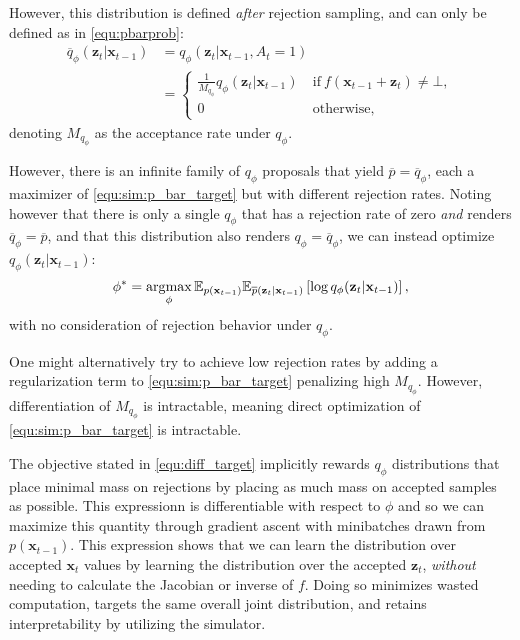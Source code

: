 However, this distribution is defined \emph{after} rejection sampling, and can only be defined as in \eqref{equ:pbarprob}:
\begin{align}
    \overline{q}_{\phi}(\mathbf{z}_t | \mathbf{x}_{t-1}) &= q_{\phi}(\mathbf{z}_t | \mathbf{x}_{t-1}, A_t = 1) \\%
    &=  \begin{cases}
    \frac{1}{M_{q_{\phi}}} q_{\phi}(\mathbf{z}_t | \mathbf{x}_{t-1})\ &\text{if}\ f(\mathbf{x}_{t-1} + \mathbf{z}_t) \neq \bot,\\
    0 & \text{otherwise},
    \end{cases}\nonumber
\end{align}
denoting $M_{q_{\phi}}$ as the acceptance rate under $q_{\phi}$.

However, there is an infinite family of $q_{\phi}$ proposals that yield $\overline{p} = \overline{q}_{\phi}$, each a maximizer of \eqref{equ:sim:p_bar_target} but with different rejection rates.
Noting however that there is only a single $q_{\phi}$ that has a rejection rate of zero \emph{and} renders $\overline{q}_{\phi} = \overline{p}$, and that this distribution also renders $q_{\phi} = \overline{q}_{\phi}$, we can instead optimize $q_{\phi}(\mathbf{z}_t | \mathbf{x}_{t-1})$:
\begin{equation}
\phi^* = \operatorname*{\arg\!\max}_{\phi} \mathbb{E}_{p(\mathbf{x}_{t-1})} \mathbb{E}_{\overline{p}(\mathbf{z}_t  | \mathbf{x}_{t-1})} \left[ \log q_{\phi} ( \mathbf{z}_t | \mathbf{x}_{t-1}) \right],\label{equ:diff_target}
\end{equation}
with no consideration of rejection behavior under $q_{\phi}$.

One might alternatively try to achieve low rejection rates by adding a regularization term to \eqref{equ:sim:p_bar_target} penalizing high $M_{q_{\phi}}$. 
However, differentiation of $M_{q_{\phi}}$ is intractable, meaning direct optimization of \eqref{equ:sim:p_bar_target} is intractable.

The objective stated in \eqref{equ:diff_target} implicitly rewards $q_{\phi}$ distributions that place minimal mass on rejections by placing as much mass on accepted samples as possible.
This expressionn is differentiable with respect to $\phi$ and so we can maximize this quantity through gradient ascent with minibatches drawn from $p(\mathbf{x}_{t-1})$.
This expression shows that we can learn the distribution over accepted $\mathbf{x}_t$ values by learning the distribution over the accepted $\mathbf{z}_t$, \emph{without} needing to calculate the Jacobian or inverse of $f$.
Doing so minimizes wasted computation, targets the same overall joint distribution, and retains interpretability by utilizing the simulator.

